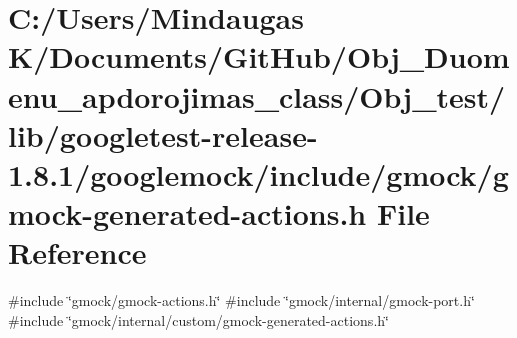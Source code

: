 \hypertarget{_obj__test_2lib_2googletest-release-1_88_81_2googlemock_2include_2gmock_2gmock-generated-actions_8h}{}\section{C\+:/\+Users/\+Mindaugas K/\+Documents/\+Git\+Hub/\+Obj\+\_\+\+Duomenu\+\_\+apdorojimas\+\_\+class/\+Obj\+\_\+test/lib/googletest-\/release-\/1.8.1/googlemock/include/gmock/gmock-\/generated-\/actions.h File Reference}
\label{_obj__test_2lib_2googletest-release-1_88_81_2googlemock_2include_2gmock_2gmock-generated-actions_8h}
{\ttfamily \#include \char`\"{}gmock/gmock-\/actions.\+h\char`\"{}}\newline
{\ttfamily \#include \char`\"{}gmock/internal/gmock-\/port.\+h\char`\"{}}\newline
{\ttfamily \#include \char`\"{}gmock/internal/custom/gmock-\/generated-\/actions.\+h\char`\"{}}\newline

